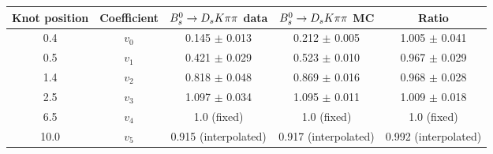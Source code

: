\begin{tabular}{c c c c c}
\hline
\hline
Knot position & Coefficient & ${{B}^0_{s}}\rightarrow{\ensuremath{{D}_{s}}}{\ensuremath{K}}{\ensuremath{\pi}}{\ensuremath{\pi}}$ data & ${{B}^0_{s}}\rightarrow{\ensuremath{{D}_{s}}}{\ensuremath{K}}{\ensuremath{\pi}}{\ensuremath{\pi}}$ MC & Ratio \\
\hline
0.4 & $v_{0}$ & 0.145 $\pm$ 0.013 & 0.212 $\pm$ 0.005 & 1.005 $\pm$ 0.041\\
0.5 & $v_{1}$ & 0.421 $\pm$ 0.029 & 0.523 $\pm$ 0.010 & 0.967 $\pm$ 0.029\\
1.4 & $v_{2}$ & 0.818 $\pm$ 0.048 & 0.869 $\pm$ 0.016 & 0.968 $\pm$ 0.028\\
2.5 & $v_{3}$ & 1.097 $\pm$ 0.034 & 1.095 $\pm$ 0.011 & 1.009 $\pm$ 0.018\\
6.5 & $v_{4}$ &  1.0 (fixed) & 1.0 (fixed) & 1.0 (fixed)\\
10.0 & $v_{5}$ & 0.915 (interpolated) & 0.917 (interpolated) & 0.992 (interpolated) \\
\hline
\hline
\end{tabular}
